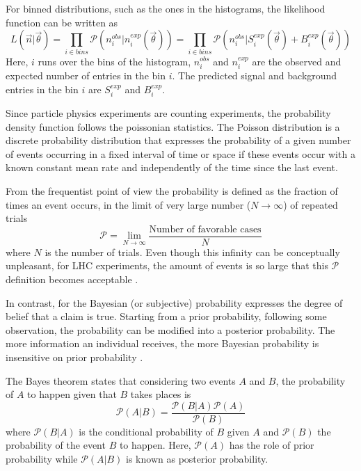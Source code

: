For binned distributions, such as the ones in the histograms, the likelihood function can be written as
\begin{equation*}
	L(\overrightarrow{n}|\overrightarrow{\theta}) 
	= \prod_{i \in bins} \mathcal{P}(n_{i}^{obs} | n_{i}^{exp}(\overrightarrow{\theta}))
	= \prod_{i \in bins} \mathcal{P}(n_{i}^{obs} | S_{i}^{exp}(\overrightarrow{\theta}) + B_{i}^{exp}(\overrightarrow{\theta}))
\end{equation*}
Here, $i$ runs over the bins of the histogram, $n_{i}^{obs}$ and $n_{i}^{exp}$ are the observed 
and expected number of entries in the bin $i$. The predicted signal and background entries in 
the bin $i$ are $S_{i}^{exp}$ and $B_{i}^{exp}$. 


Since particle physics experiments are counting experiments, the probability density function follows 
the poissonian statistics. The Poisson distribution is a discrete probability distribution 
that expresses the probability of a given number of events occurring in a fixed interval 
of time or space if these events occur with a known constant mean rate and independently 
of the time since the last event. 

From the frequentist point of view the probability is defined as the fraction of times an 
event occurs, in the limit of very large number ($N \to \infty$) of repeated trials
\begin{equation*}
	 \mathcal{P} = \lim_{N \to \infty} \frac{\text{Number of favorable cases}}{N}
\end{equation*}
where $N$ is the number of trials. Even though this infinity can be conceptually unpleasant, for 
LHC experiments, the amount of events is so large that this $\mathcal{P}$ definition becomes
acceptable \cite{Lista:2016chp}. 

In contrast, for the Bayesian (or subjective) probability expresses the degree of belief that a 
claim is true. Starting from a prior probability, following some observation, the probability can 
be modified into a posterior probability. The more information an individual receives, the more 
Bayesian probability is insensitive on prior probability \cite{Lista:2016chp}.

The Bayes theorem \cite{Bayes:1764vd} states that considering two events $A$ and $B$, the probability of $A$
to happen given that $B$ takes places is
\begin{equation*}
	 \mathcal{P}(A|B)= \frac{\mathcal{P}(B|A)\mathcal{P}(A)}{\mathcal{P}(B)}
\end{equation*}
where $\mathcal{P}(B|A)$ is the conditional probability of $B$ given $A$ and $\mathcal{P}(B)$ 
the probability of the event $B$ to happen. 
Here, $\mathcal{P}(A)$ has the role of prior probability while $\mathcal{P}(A|B)$ is known
as posterior probability.


